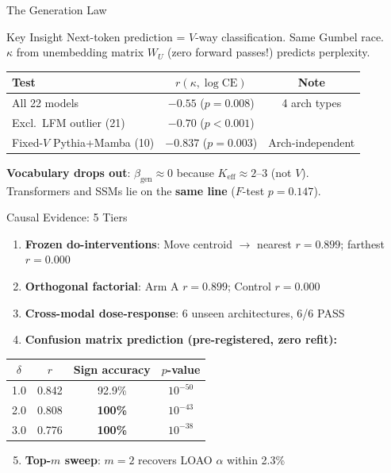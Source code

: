\documentclass[aspectratio=169,14pt]{beamer}
\begin{document}
\begin{frame}{The Generation Law}
\begin{block}{Key Insight}
Next-token prediction = $V$-way classification. Same Gumbel race.\\
$\kappa$ from unembedding matrix $W_U$ (zero forward passes!) predicts perplexity.
\end{block}

\vspace{0.3cm}
\begin{center}
\begin{tabular}{lcc}
\toprule
\textbf{Test} & $r(\kappa, \log\mathrm{CE})$ & \textbf{Note} \\
\midrule
All 22 models & $-0.55$ ($p = 0.008$) & 4 arch types \\
Excl.\ LFM outlier (21) & $-0.70$ ($p < 0.001$) & \\
Fixed-$V$ Pythia+Mamba (10) & $-0.837$ ($p = 0.003$) & Arch-independent \\
\bottomrule
\end{tabular}
\end{center}

\vspace{0.3cm}
\textbf{Vocabulary drops out}: $\beta_\mathrm{gen} \approx 0$ because $K_\mathrm{eff} \approx 2$--$3$ (not $V$).\\
Transformers and SSMs lie on the \textbf{same line} ($F$-test $p = 0.147$).
\end{frame}

\begin{frame}{Causal Evidence: 5 Tiers}
\begin{enumerate}
\item \textbf{Frozen do-interventions}: Move centroid $\to$ nearest $r = 0.899$; farthest $r = 0.000$
\item \textbf{Orthogonal factorial}: Arm A $r = 0.899$; Control $r = 0.000$
\item \textbf{Cross-modal dose-response}: 6 unseen architectures, 6/6 PASS
\item \textbf{Confusion matrix prediction (pre-registered, zero refit):}
\end{enumerate}

\begin{center}
\begin{tabular}{cccc}
\toprule
$\delta$ & $r$ & Sign accuracy & $p$-value \\
\midrule
1.0 & 0.842 & 92.9\% & $10^{-50}$ \\
2.0 & 0.808 & \textbf{100\%} & $10^{-43}$ \\
3.0 & 0.776 & \textbf{100\%} & $10^{-38}$ \\
\bottomrule
\end{tabular}
\end{center}

\begin{enumerate}
\setcounter{enumi}{4}
\item \textbf{Top-$m$ sweep}: $m{=}2$ recovers LOAO $\alpha$ within 2.3\%
\end{enumerate}
\end{frame}
\end{document}
